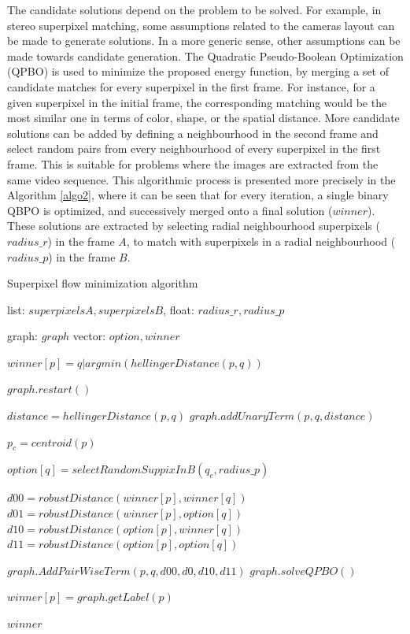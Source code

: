 The candidate solutions depend on the problem to be solved. 
For example, in stereo superpixel matching, some assumptions related to the cameras 
layout can be made to generate solutions. In a more generic sense, other assumptions can be made towards 
candidate generation. 
The Quadratic Pseudo-Boolean Optimization (QPBO) \cite{c3}\cite{c4} is used to minimize the proposed energy function, 
by merging a set of candidate matches for every superpixel in the first frame.
For instance, for a given superpixel in the initial frame, the corresponding 
matching would be the most similar one in terms of color, shape, or the spatial distance. More candidate solutions can be added by defining a
neighbourhood in the second frame and select random pairs from every neighbourhood of every superpixel
in the first frame. This is suitable for problems where the images are extracted from the same video
sequence. This algorithmic process is presented more precisely in the Algorithm \ref{algo2}, where it 
can be seen that for every iteration, a single binary QBPO is optimized, and successively 
merged onto a final solution ($winner$). These solutions are extracted by selecting 
radial neighbourhood superpixels ($radius\_r$) in the frame $A$, to match with 
superpixels in a radial neighbourhood ($radius\_p$) in the frame $B$.

\begin{algorithm}[thpb]
\caption{Superpixel flow minimization algorithm}
\label{algo2}
\begin{algorithmic}
\REQUIRE list: $superpixelsA, superpixelsB$, float: $radius\_r, radius\_p$

graph: $graph$
vector: $option, winner$

\STATE $winner[p] = q | argmin( hellingerDistance(p, q) )$
	
	\STATE $graph.restart()$
	
	
    		\STATE $distance = hellingerDistance(p, q)$
    		\STATE $graph.addUnaryTerm(p, q, distance)$

		\ENDFOR
	\ENDFOR

		\STATE $p_c = centroid(p)$

		\STATE $option[q] = selectRandomSuppixInB( q_c, radius\_p )$
		
		\STATE $d00 = robustDistance(winner[p], winner[q])$
		\STATE $d01 = robustDistance(winner[p], option[q])$
		\STATE $d10 = robustDistance(option[p], winner[q])$
		\STATE $d11 = robustDistance(option[p], option[q])$
								
		\STATE $graph.AddPairWiseTerm(p,q,d00,d0,d10,d11)$
		\STATE $graph.solveQPBO()$
		\ENDFOR
	\ENDFOR
	
		\STATE $winner[p] = graph.getLabel(p)$
	\ENDFOR
\ENDFOR

\RETURN $winner$
\end{algorithmic}
\end{algorithm}

